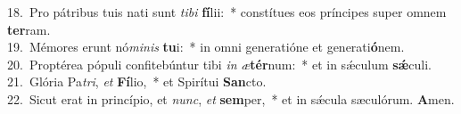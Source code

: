 {18.~}Pro pátribus tuis nati sunt \textit{ti}\textit{bi} \textbf{fí}lii:~* constítues eos príncipes super omnem \textbf{ter}ram.\\
{19.~}Mémores erunt nó\textit{mi}\textit{nis} \textbf{tu}i:~* in omni generatióne et generati\textbf{ó}nem.\\
{20.~}Proptérea pópuli confitebúntur tibi \textit{in} \textit{æ}\textbf{tér}num:~* et in sǽculum \textbf{sǽ}culi.\\
{21.~}Glória Pa\textit{tri}, \textit{et} \textbf{Fí}lio,~* et Spirítui \textbf{San}cto.\\
{22.~}Sicut erat in princípio, et \textit{nunc}, \textit{et} \textbf{sem}per,~* et in sǽcula sæculórum. \textbf{A}men.\\
